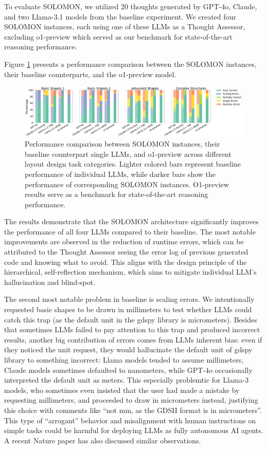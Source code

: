 \documentclass{article}
\begin{document}
To evaluate SOLOMON, we utilized 20 thoughts generated by GPT-4o, Claude, and two Llama-3.1 models from the baseline experiment. We created four SOLOMON instances, each using one of these LLMs as a Thought Assessor, excluding o1-preview which served as our benchmark for state-of-the-art reasoning performance.

Figure \ref{fig:performance_comparison} presents a performance comparison between the SOLOMON instances, their baseline counterparts, and the o1-preview model.

\begin{figure}[h]
  \centering
  \includegraphics[width=\textwidth]{output.png}
  \caption{Performance comparison between SOLOMON instances, their baseline counterpart single LLMs, and o1-preview across different layout design task categories. Lighter colored bars represent baseline performance of individual LLMs, while darker bars show the performance of corresponding SOLOMON instances. O1-preview results serve as a benchmark for state-of-the-art reasoning performance.}
  \label{fig:performance_comparison}
\end{figure}

The results demonstrate that the SOLOMON architecture significantly improves the performance of all four LLMs compared to their baseline. The most notable improvements are observed in the reduction of runtime errors, which can be attributed to the Thought Assessor seeing the error log of previous generated code and knowing what to avoid. This aligns with the design principle of the hierarchical, self-reflection mechanism, which aims to mitigate individual LLM's hallucination and blind-spot.

The second most notable problem in baseline is scaling errors. We intentionally requested basic shapes to be drawn in millimeters to test whether LLMs could catch this trap (as the default unit in the gdspy library is micrometers). Besides that sometimes LLMs failed to pay attention to this trap and produced incorrect results, another big contribution of errors comes from LLMs inherent bias: even if they noticed the unit request, they would hallucinate the default unit of gdspy library to something incorrect: Llama models tended to assume millimeters, Claude models sometimes defaulted to nanometers, while GPT-4o occasionally interpreted the default unit as meters. This especially problemtic for Llama-3 models, who sometimes even insisted that the user had made a mistake by requesting millimeters, and proceeded to draw in micrometers instead, justifying this choice with comments like ``not mm, as the GDSII format is in micrometers''. This type of ``arrogant'' behavior and misalignment with human instructions on simple tasks could be harmful for deploying LLMs as fully autonomous AI agents. A recent Nature paper \cite{ZhouNature2024} has also discussed similar observations. 
\end{document}
